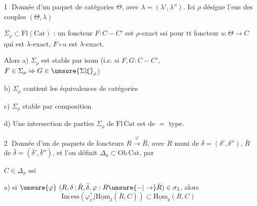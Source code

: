 


\textcircled{1} Donnée d'un paquet \inserted{$\rho$} de catégories $\Theta$, avec $\lambda=(\lambda',\lambda'')$. Ici $\rho$ désigne  l'ens des couples $(\Theta,\lambda)$


$\Sigma_\rho\subset\mathrm{Fl}(\mathrm{Cat})$ : un foncteur $F:C-C'$ est $\rho$-exact ssi pour tt  foncteur $u:\Theta\to C$ qui est $\lambda$-exact, $F\circ u$ est $\lambda$-exact.

Alors \quad a) $\Sigma_\rho$ est stable par isom (i.e. si $F,G:C-C'$,  $F\in\Sigma_\rho\Rightarrow G\in\unsure{\Sigma|\xi}_\rho$)

b) $\Sigma_\rho$ contient les équivalences de catégories

c) $\Sigma_\rho$ stable par composition

d) Une intersection de parties $\Sigma_\rho$ de $\mathrm{Fl}\,\mathrm{Cat}$ est de $=$ type.

\textcircled{2} Donnée d'un  de paquets de foncteurs $R\xrightarrow{\varphi}\bar R$, avec \deleted{\unsure{$\varphi$}} $R$ muni de $\delta=(\delta',\delta'')$, $\bar R$ de $\bar\delta=(\bar\delta',\bar\delta'')$, et  l'on définit $\Delta_\sigma\subset\mathrm{Ob}\,\mathrm{Cat}$. par


$C\in\Delta_\sigma$ ssi

a) si $\unsure{\varphi}\ (R,\delta\,;\bar R,\bar\delta,\varphi:R\unsure{-|\to}\bar R)\in\sigma_1$, alors
\[
\mathrm{Im\,ess}(\varphi_C^*\vert\underline{\mathrm{Hom}}_{\bar\delta}(\bar R,C))\subset\underline{\mathrm{Hom}}_\delta(R,C)
\]

